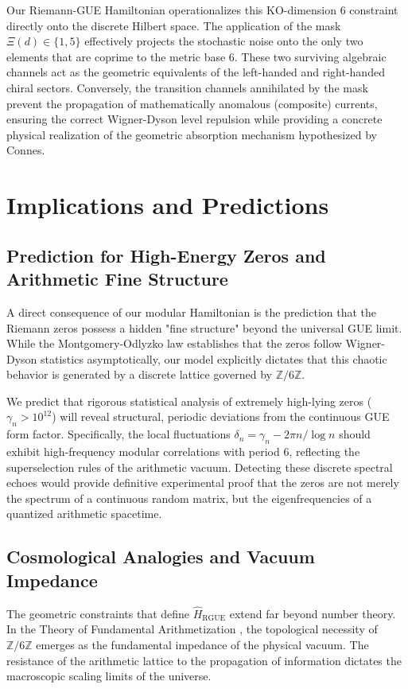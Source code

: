 \documentclass[prl,aps,floatfix,superscriptaddress,10pt]{revtex4-2}
\newcommand{\Zmod}{\mathbb{Z}/6\mathbb{Z}}
\begin{document}
Our Riemann-GUE Hamiltonian operationalizes this KO-dimension 6 constraint directly onto the discrete Hilbert space. The application of the mask $\Xi(d) \in \{1,5\}$ effectively projects the stochastic noise onto the only two elements that are coprime to the metric base 6. These two surviving algebraic channels act as the geometric equivalents of the left-handed and right-handed chiral sectors. Conversely, the transition channels annihilated by the mask prevent the propagation of mathematically anomalous (composite) currents, ensuring the correct Wigner-Dyson level repulsion while providing a concrete physical realization of the geometric absorption mechanism hypothesized by Connes.

\section{Implications and Predictions}

\subsection{Prediction for High-Energy Zeros and Arithmetic Fine Structure}

A direct consequence of our modular Hamiltonian is the prediction that the Riemann zeros possess a hidden "fine structure" beyond the universal GUE limit. While the Montgomery-Odlyzko law establishes that the zeros follow Wigner-Dyson statistics asymptotically, our model explicitly dictates that this chaotic behavior is generated by a discrete lattice governed by $\Zmod$.

We predict that rigorous statistical analysis of extremely high-lying zeros ($\gamma_n > 10^{12}$) will reveal structural, periodic deviations from the continuous GUE form factor. Specifically, the local fluctuations $\delta_n = \gamma_n - 2\pi n/\log n$ should exhibit high-frequency modular correlations with period 6, reflecting the superselection rules of the arithmetic vacuum. Detecting these discrete spectral echoes would provide definitive experimental proof that the zeros are not merely the spectrum of a continuous random matrix, but the eigenfrequencies of a quantized arithmetic spacetime.

\subsection{Cosmological Analogies and Vacuum Impedance}

The geometric constraints that define $\hat{H}_{\text{RGUE}}$ extend far beyond number theory. In the Theory of Fundamental Arithmetization \cite{PeinadorGenesis}, the topological necessity of $\Zmod$ emerges as the fundamental impedance of the physical vacuum. The resistance of the arithmetic lattice to the propagation of information dictates the macroscopic scaling limits of the universe.
\end{document}
